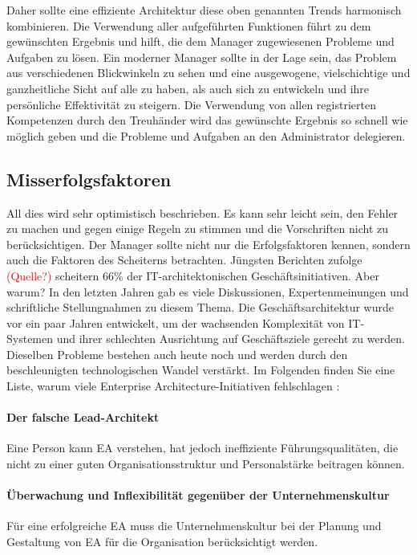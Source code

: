 \documentclass[
	doc,
	a4paper,
	helv
	]{apa6}
\begin{document}
Daher sollte eine effiziente Architektur diese oben genannten Trends harmonisch kombinieren. Die Verwendung aller aufgeführten Funktionen führt zu dem gewünschten Ergebnis und hilft, die dem Manager zugewiesenen Probleme und Aufgaben zu lösen. Ein moderner Manager sollte in der Lage sein, das Problem aus verschiedenen Blickwinkeln zu sehen und eine ausgewogene, vielschichtige und ganzheitliche Sicht auf alle zu haben, als auch sich zu entwickeln und ihre persönliche Effektivität zu steigern. Die Verwendung von allen registrierten Kompetenzen durch den Treuhänder wird das gewünschte Ergebnis so schnell wie möglich geben und die Probleme und Aufgaben an den Administrator delegieren.

\subsection{Misserfolgsfaktoren}
All dies wird sehr optimistisch beschrieben. Es kann sehr leicht sein, den Fehler zu machen und gegen einige Regeln zu stimmen und die Vorschriften nicht zu berücksichtigen. Der Manager sollte nicht nur die Erfolgsfaktoren kennen, sondern auch die Faktoren des Scheiterns betrachten.
Jüngsten Berichten zufolge \textcolor{red}{(Quelle?)} scheitern 66\% der IT-architektonischen Geschäftsinitiativen. Aber warum? In den letzten Jahren gab es viele Diskussionen, Expertenmeinungen und schriftliche Stellungnahmen zu diesem Thema.
Die Geschäftsarchitektur wurde vor ein paar Jahren entwickelt, um der wachsenden Komplexität von IT-Systemen und ihrer schlechten Ausrichtung auf Geschäftsziele gerecht zu werden. Dieselben Probleme bestehen auch heute noch und werden durch den beschleunigten technologischen Wandel verstärkt.
Im Folgenden finden Sie eine Liste, warum viele Enterprise Architecture-Initiativen fehlschlagen \autocite{Kabai2010}:


\paragraph{Der falsche Lead-Architekt}
Eine Person kann EA verstehen, hat jedoch ineffiziente Führungsqualitäten, die nicht zu einer guten Organisationsstruktur und Personalstärke beitragen können.
\paragraph{Überwachung und Inflexibilität gegenüber der Unternehmenskultur}
Für eine erfolgreiche EA muss die Unternehmenskultur bei der Planung und Gestaltung von EA für die Organisation berücksichtigt werden.
\end{document}
